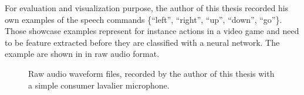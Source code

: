 For evaluation and visualization purpose, the author of this thesis recorded his own examples of the speech commands \{\enquote{left}, \enquote{right}, \enquote{up}, \enquote{down}, \enquote{go}\}.
Those showcase examples represent for instance actions in a video game and need to be feature extracted before they are classified with a neural network.
The example are shown in  in raw audio format.
\begin{figure}[!ht]
  \centering
  \caption{Raw audio waveform files, recorded by the author of this thesis with a simple consumer lavalier microphone.}
  \label{fig:signal_raw_showcase}
\end{figure}
\FloatBarrier
\noindent
